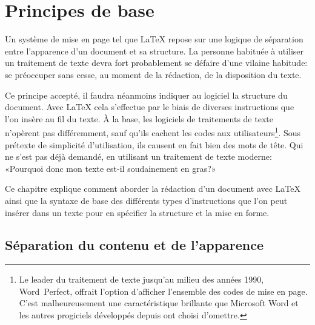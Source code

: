 
\chapter{Principes de base}
\label{chap:bases}

Un système de mise en page tel que {\LaTeX} repose sur une logique de
séparation entre l'apparence d'un document et sa structure. La
personne habituée à utiliser un traitement de texte devra fort
probablement se défaire d'une vilaine habitude: se préoccuper sans
cesse, au moment de la rédaction, de la disposition du texte.

Ce principe accepté, il faudra néanmoins indiquer au logiciel la
structure du document. Avec {\LaTeX} cela s'effectue par le biais de
diverses instructions que l'on insère au fil du texte. À la base, les
logiciels de traitements de texte n'opèrent pas différemment, sauf
qu'ils cachent les codes aux utilisateurs\footnote{%
  Le leader du traitement de texte jusqu'au milieu des années 1990,
  Word~Perfect, offrait l'option d'afficher l'ensemble des codes de
  mise en page. C'est malheureusement une caractéristique brillante
  que Microsoft Word et les autres progiciels développés depuis ont
  choisi d'omettre.}. %
Sous prétexte de simplicité d'utilisation, ils causent en fait bien
des mots de tête. Qui ne s'est pas déjà demandé, en utilisant un
traitement de texte moderne: «Pourquoi donc mon texte est-il
soudainement en gras?»

Ce chapitre explique comment aborder la rédaction d'un document avec
{\LaTeX} ainsi que la syntaxe de base des différents types
d'instructions que l'on peut insérer dans un texte pour en spécifier
la structure et la mise en forme.


\section{Séparation du contenu et de l'apparence}
\label{sec:bases:separation}

